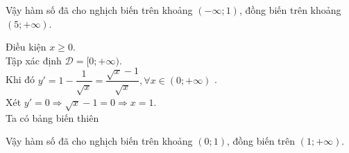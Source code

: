 \begin{bt}
{\begin{listEX}
            \begin{center}
            \end{center}
            Vậy hàm số đã cho nghịch biến trên khoảng $(-\infty;1)$, đồng biến trên khoảng $(5;+\infty)$.
            \item
            Điều kiện $x \geq 0$.\\
            Tập xác định $\mathscr{D}= [0;+\infty)$.\\
            Khi đó $y'=1-\dfrac{1}{\sqrt{x}}=\dfrac{\sqrt{x}-1}{\sqrt{x}},\forall x\in (0;+\infty)$ .\\
            Xét $y'=0\Rightarrow \sqrt{x}-1 =0\Rightarrow x=1.$\\
            Ta có bảng biến thiên
            \begin{center}
            \end{center}
            Vậy hàm số đã cho nghịch biến trên khoảng $(0;1)$, đồng biến trên $(1;+\infty)$.
        \end{listEX}
    }
\end{bt}
